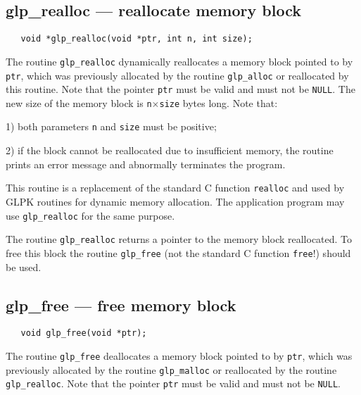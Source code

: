 \subsection{glp\_realloc --- reallocate memory block}

\synopsis

\begin{verbatim}
   void *glp_realloc(void *ptr, int n, int size);
\end{verbatim}

\description

The routine \verb|glp_realloc| dynamically reallocates a memory block
pointed to by \verb|ptr|, which was previously allocated by the routine
\verb|glp_alloc| or reallocated by this routine. Note that the pointer
\verb|ptr| must be valid and must not be \verb|NULL|. The new size of
the memory block is \verb|n|$\times$\verb|size| bytes long. Note that:

1) both parameters \verb|n| and \verb|size| must be positive;

2) if the block cannot be reallocated due to insufficient memory, the
routine prints an error message and abnormally terminates the program.

This routine is a replacement of the standard C function \verb|realloc|
and used by GLPK routines for dynamic memory allocation. The
application program may use \verb|glp_realloc| for the same purpose.

\returns

The routine \verb|glp_realloc| returns a pointer to the memory block
reallocated. To free this block the routine \verb|glp_free| (not the
standard C function \verb|free|!) should be used.

\newpage

\subsection{glp\_free --- free memory block}

\synopsis

\begin{verbatim}
   void glp_free(void *ptr);
\end{verbatim}

\description

The routine \verb|glp_free| deallocates a memory block pointed to by
\verb|ptr|, which was previously allocated by the routine
\verb|glp_malloc| or reallocated by the routine \verb|glp_realloc|.
Note that the pointer \verb|ptr| must be valid and must not be
\verb|NULL|.

